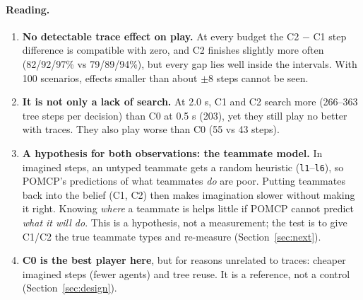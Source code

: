 \documentclass[11pt,a4paper]{article}
\newcommand{\code}[1]{\texttt{#1}}
\theoremstyle{remark}
\begin{document}
\paragraph{Reading.}
\begin{enumerate}[leftmargin=*]
  \item \textbf{No detectable trace effect on play.} At every budget the C2 $-$ C1 step difference is compatible with zero,
        and C2 finishes slightly more often (82/92/97\% vs 79/89/94\%), but every gap lies well inside the intervals.
        With 100 scenarios, effects smaller than about $\pm 8$ steps cannot be seen.
  \item \textbf{It is not only a lack of search.} At 2.0 s, C1 and C2 search more (266--363 tree steps per decision) than
        C0 at 0.5 s (203), yet they still play no better with traces. They also play worse than C0 (55 vs 43 steps).
  \item \textbf{A hypothesis for both observations: the teammate model.} In imagined steps, an untyped teammate gets a
        random heuristic (\code{l1}--\code{l6}), so POMCP's predictions of what teammates \emph{do} are poor. Putting
        teammates back into the belief (C1, C2) then makes imagination slower without making it right. Knowing
        \emph{where} a teammate is helps little if POMCP cannot predict \emph{what it will do}. This is a hypothesis, not a measurement; the test is to give C1/C2 the true
        teammate types and re-measure (Section~\ref{sec:next}).
  \item \textbf{C0 is the best player here}, but for reasons unrelated to traces: cheaper imagined steps (fewer agents)
        and tree reuse. It is a reference, not a control (Section~\ref{sec:design}).
\end{enumerate}
\end{document}
